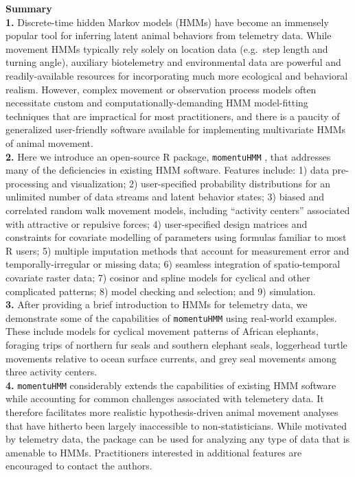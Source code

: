 \documentclass[12pt]{article}\usepackage[]{graphicx}\usepackage[]{color}
\begin{document}
\noindent \textbf{Summary}\\
\textbf{1.} Discrete-time hidden Markov models (HMMs) have become an immensely popular tool for inferring latent animal behaviors from telemetry data. While movement HMMs typically rely solely on location data (e.g.\ step length and turning angle), auxiliary biotelemetry and environmental data are powerful and readily-available resources for incorporating much more ecological and behavioral realism. However, complex movement or observation process models often necessitate custom and computationally-demanding HMM model-fitting techniques that are impractical for most practitioners, and there is a paucity of generalized user-friendly software available for implementing multivariate HMMs of animal movement.\\
\textbf{2.} Here we introduce an open-source R package, \verb|momentuHMM|%
, that addresses many of the deficiencies in existing HMM software.  Features include: 1) data pre-processing and visualization; 2) user-specified probability distributions for an unlimited number of data streams and latent behavior states; %
3) biased and correlated random walk movement models, including ``activity centers'' associated with attractive or repulsive forces; 4) user-specified design matrices and constraints for covariate modelling of parameters using formulas familiar to most R users; 5) multiple imputation methods that account for measurement error and temporally-irregular or missing data; 6) seamless integration of spatio-temporal covariate raster data; 7) cosinor and spline models for cyclical and other complicated patterns; 8) model checking and selection; and 9) simulation.\\%
\textbf{3.} After providing a brief introduction to HMMs for telemetry data, we demonstrate some of the capabilities of \verb|momentuHMM| using real-world examples. These include models for cyclical movement patterns of African elephants, foraging trips of northern fur seals and southern elephant seals, loggerhead turtle movements relative to ocean surface currents, and grey seal movements among three activity centers.\\
\textbf{4.} \verb|momentuHMM| considerably extends the capabilities of existing HMM software while accounting for common challenges associated with telemetery data. It therefore facilitates more realistic hypothesis-driven animal movement analyses that have hitherto been largely inaccessible to non-statisticians.  While motivated by telemetry data, the package can be used for analyzing any type of data that is amenable to HMMs. Practitioners interested in additional features are encouraged to contact the authors.\\
\end{document}
